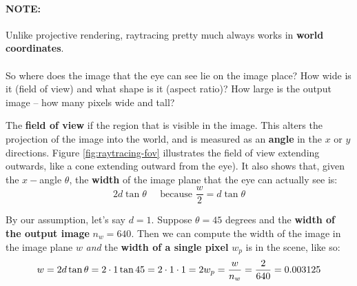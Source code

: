 \documentclass{article}
\begin{document}
\paragraph{\textbf{NOTE: }} Unlike projective rendering, raytracing pretty much always works in \textbf{world coordinates}.
\paragraph{}

So where does the image that the eye can see lie on the image place? How wide is it (field of view) and what shape is it (aspect ratio)? How large is the output image -- how many pixels wide and tall?

The \textbf{field of view} if the region that is visible in the image. This alters the projection of the image into the world, and is measured as an \textbf{angle} in the $x$ or $y$ directions. Figure \ref{fig:raytracing-fov} illustrates the field of view extending outwards, like a cone extending outward from the eye). It also shows that, given the $x-$angle $\theta$, the \textbf{width} of the image plane that the eye can actually see is:
\begin{equation}
	2 d \tan \theta \;\;\;\;\; \text{because }\frac{w}{2} = d \tan \theta
\end{equation}

By our assumption, let's say $d = 1$. Suppose $\theta = 45$ degrees and the \textbf{width of the output image} $n_w = 640$. Then we can compute the width of the image in the image plane $w$ \textit{and} the \textbf{width of a single pixel} $w_p$ is in the scene, like so:
\begin{equation}
	w = 2 d \tan \theta = 2 \cdot 1 \tan 45 = 2 \cdot 1 \cdot 1 = 2 \\
	w_p = \frac{w}{n_w} = \frac{2}{640} = 0.003125
\end{equation}
\end{document}
